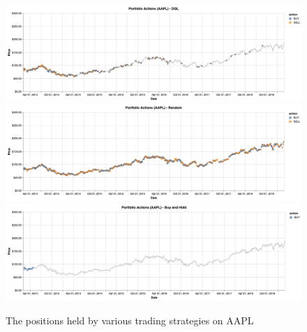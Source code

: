 \documentclass[12pt, authoryear]{elsarticle}
\begin{document}
\begin{figure}[H]
  \begin{center} 
  	\caption{The positions held by various trading strategies on AAPL}
  	\label{my-label}
	\includegraphics[scale=0.42]{figures/aapl_action_dql.png} \\
	\includegraphics[scale=0.42]{figures/aapl_action_rand.png} \\
	\includegraphics[scale=0.42]{figures/aapl_action_bh.png} \\
	\label{fig:aaplaction}
\end{center} 
\end{figure}
\end{document}
